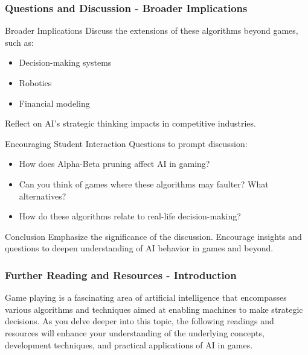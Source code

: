 \documentclass[aspectratio=169]{beamer}
\begin{document}
\begin{frame}[fragile]
    \frametitle{Questions and Discussion - Broader Implications}
    \begin{block}{Broader Implications}
        Discuss the extensions of these algorithms beyond games, such as:
        \begin{itemize}
            \item Decision-making systems
            \item Robotics
            \item Financial modeling
        \end{itemize}
        Reflect on AI's strategic thinking impacts in competitive industries.
    \end{block}
    
    \begin{block}{Encouraging Student Interaction}
        Questions to prompt discussion:
        \begin{itemize}
            \item How does Alpha-Beta pruning affect AI in gaming?
            \item Can you think of games where these algorithms may faulter? What alternatives?
            \item How do these algorithms relate to real-life decision-making?
        \end{itemize}
    \end{block}
    
    \begin{block}{Conclusion}
        Emphasize the significance of the discussion. Encourage insights and questions to deepen understanding of AI behavior in games and beyond.
    \end{block}
\end{frame}

\begin{frame}[fragile]
    \frametitle{Further Reading and Resources - Introduction}
    Game playing is a fascinating area of artificial intelligence that encompasses various algorithms and techniques aimed at enabling machines to make strategic decisions. 
    As you delve deeper into this topic, the following readings and resources will enhance your understanding of the underlying concepts, development techniques, and practical applications of AI in games.
\end{frame}
\end{document}
